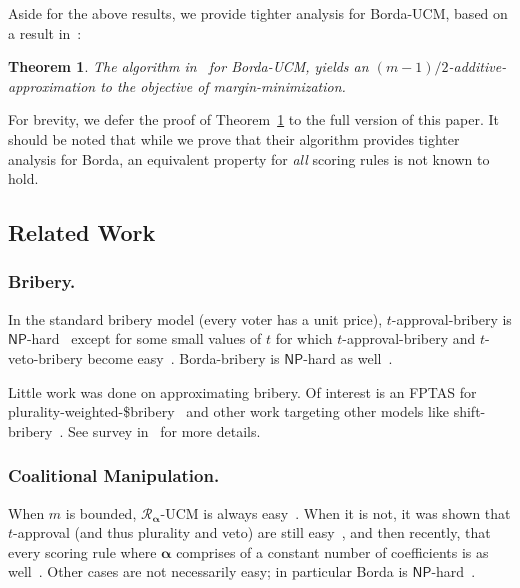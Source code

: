 \documentclass[letterpaper]{article} %
\newtheorem{theorem}{Theorem}
\theoremstyle{definition}
\newcommand\vecgreek{\bm}
\newcommand{\veca}{\vecgreek{\alpha}}
\newcommand{\Ra}{\mathcal{R}_{\veca}}
\newcommand{\NP}{\mathsf{NP}}
\begin{document}
Aside for the above results, we provide tighter analysis for Borda-UCM, based on a result in~\cite{DBLP:journals/ai/ZuckermanPR09}:
\begin{theorem}\label{thr:zuck}
	The algorithm in~\cite{DBLP:journals/ai/ZuckermanPR09} for Borda-UCM, yields an $(m-1)/2$-additive-approximation to the objective of margin-minimization.
\end{theorem}
For brevity, we defer the proof of Theorem~\ref{thr:zuck} to the full version of this paper. It should be noted that while we prove that their algorithm provides tighter analysis for Borda, an equivalent property for \emph{all}  scoring rules is not known to hold.


\subsection{Related Work}
\subsubsection{Bribery.}
In the standard bribery model (every voter has a unit price), $t$-approval-bribery is $\NP$-hard~\cite{lin2012solving} except for some small values of $t$ for which $t$-approval-bribery and $t$-veto-bribery become easy~\cite{DBLP:journals/jair/FaliszewskiHH09}. Borda-bribery is $\NP$-hard as well~\cite{DBLP:conf/aaai/BrelsfordFHSS08}.

Little work was done on approximating bribery. Of interest is an FPTAS for plurality-weighted-\$bribery~\cite{DBLP:conf/atal/Faliszewski08} and other work
targeting other models like  shift-bribery~\cite{DBLP:conf/sagt/ElkindFS09,DBLP:conf/wine/ElkindF10,DBLP:journals/iandc/BredereckCFNN16}. See survey in~\cite{DBLP:reference/choice/FaliszewskiR16} for more details.



\subsubsection{Coalitional Manipulation.} When $m$ is bounded, $\Ra$-UCM is always easy~\cite{DBLP:journals/jacm/ConitzerSL07}. When it is not, it was shown that $t$-approval (and thus plurality and veto) are still easy~\cite{DBLP:journals/ai/ZuckermanPR09,lin2012solving}, and then recently, that every scoring rule where $\veca$ comprises of a constant number of coefficients is as well~\cite{DBLP:conf/ecai/HemaspaandraS16}.
Other cases are not necessarily easy; in particular Borda is $\NP$-hard~\cite{DBLP:conf/ijcai/BetzlerNW11,DBLP:journals/ai/DaviesKNWX14}.
\end{document}
